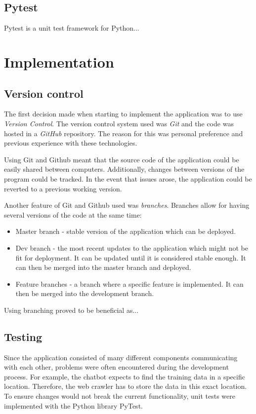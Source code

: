 \documentclass[12pt,a4paper]{article}
\begin{document}
\subsection{Pytest}
Pytest is a unit test framework for Python...

\newpage
\section{Implementation}\label{sec:impl}
\subsection{Version control}
The first decision made when starting to implement the application was to use \textit{Version Control}. The version control system used was \textit{Git} and the code was hosted in a \textit{GitHub} repository. The reason for this was personal preference and previous experience with these technologies. 

Using Git and Github meant that the source code of the application could be easily shared between computers. Additionally, changes between versions of the program could be tracked. In the event that issues arose, the application could be reverted to a previous working version. 

Another feature of Git and Github used was \textit{branches}. Branches allow for having several versions of the code at the same time:
\begin{itemize}
    \item Master branch - stable version of the application which can be deployed.
    \item Dev branch - the most recent updates to the application which might not be fit for deployment. It can be updated until it is considered stable enough. It can then be merged into the master branch and deployed.
    \item Feature branches - a branch where a specific feature is implemented. It can then be merged into the development branch.
\end{itemize}

Using branching proved to be beneficial as... 

\subsection{Testing}
Since the application consisted of many different components communicating with each other, problems were often encountered during the development process. For example, the chatbot expects to find the training data in a specific location. Therefore, the web crawler has to store the data in this exact location. To ensure changes would not break the current functionality, unit tests were implemented with the Python library PyTest. 
\end{document}

